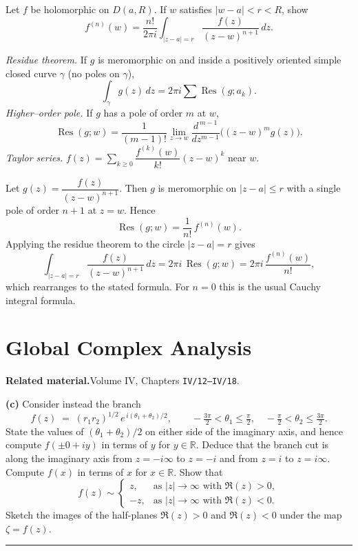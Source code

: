 \begin{problem}[CP-IV-0139]
\label{prob:cp-iv-0139}
Let $f$ be holomorphic on $D(a,R)$. If $w$ satisfies $|w-a|<r<R$, show
\[
f^{(n)}(w)=\frac{n!}{2\pi i}\int_{|z-a|=r}\frac{f(z)}{(z-w)^{n+1}}\,dz.
\]

\emph{Residue theorem.} If $g$ is meromorphic on and inside a positively oriented simple closed curve $\gamma$ (no poles on $\gamma$),
\[
\int_\gamma g(z)\,dz = 2\pi i \sum \operatorname{Res}(g;a_k).
\]
\emph{Higher–order pole.} If $g$ has a pole of order $m$ at $w$,
\[
\operatorname{Res}(g;w)=\frac{1}{(m-1)!}\lim_{z\to w}\frac{d^{\,m-1}}{dz^{m-1}}\Big((z-w)^m g(z)\Big).
\]
\emph{Taylor series.} $f(z)=\sum_{k\ge0}\dfrac{f^{(k)}(w)}{k!}(z-w)^k$ near $w$.

\medskip
\end{problem}



\begin{solution}
Let $g(z)=\dfrac{f(z)}{(z-w)^{n+1}}$. Then $g$ is meromorphic on $|z-a|\le r$ with a single pole of order $n+1$ at $z=w$.
Hence
\[
\operatorname{Res}(g;w)=\frac{1}{n!}\,f^{(n)}(w).
\]
Applying the residue theorem to the circle $|z-a|=r$ gives
\[
\int_{|z-a|=r}\frac{f(z)}{(z-w)^{n+1}}\,dz
= 2\pi i\,\operatorname{Res}(g;w)
= 2\pi i\,\frac{f^{(n)}(w)}{n!},
\]
which rearranges to the stated formula. For $n=0$ this is the usual Cauchy integral formula.

\medskip
\end{solution}

\section{Global Complex Analysis}

\par\medskip\noindent\textbf{Related material.}\quad Volume IV, Chapters \texttt{IV/12--IV/18}.

\begin{problem}[CP-IV-0004]
\label{prob:cp-iv-0004}
\par\noindent\textbullet\quad \textbf{(c)}\;
	Consider instead the branch
	\[
	f(z) \;=\; (r_{1}r_{2})^{1/2} \, e^{\,i(\theta_{1}+\theta_{2})/2},
	\qquad -\tfrac{3\pi}{2}<\theta_{1}\le \tfrac{\pi}{2},\quad
	-\tfrac{\pi}{2}<\theta_{2}\le \tfrac{3\pi}{2}.
	\]
	State the values of \((\theta_{1}+\theta_{2})/2\) on either side of the imaginary axis,
	and hence compute \(f(\pm0+iy)\) in terms of \(y\) for \(y\in\mathbb{R}\).
	Deduce that the branch cut is along the imaginary axis
	from \(z=-i\infty\) to \(z=-i\) and from \(z=i\) to \(z=i\infty\).
	Compute \(f(x)\) in terms of \(x\) for \(x\in\mathbb{R}\).
	Show that
	\[
	f(z)\sim
	\begin{cases}
		z,  & \text{as } |z|\to\infty \text{ with } \Re(z)>0,\\[2pt]
		-z,  & \text{as } |z|\to\infty \text{ with } \Re(z)<0.
	\end{cases}
	\]
	Sketch the images of the half-planes \(\Re(z)>0\) and \(\Re(z)<0\) under the map \(\zeta=f(z)\).

	\bigskip\hrule\bigskip
\end{problem}

